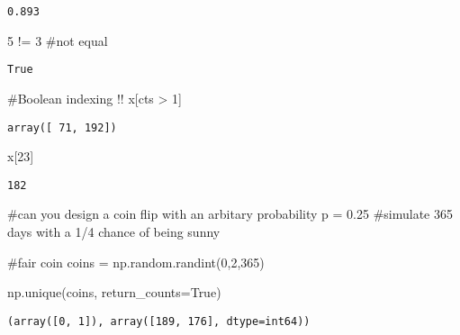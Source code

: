 \documentclass[
  letterpaper,
  DIV=11,
  numbers=noendperiod]{scrreprt}
\newenvironment{Shaded}{\begin{snugshade}}{\end{snugshade}}
\newcommand{\CommentTok}[1]{\textcolor[rgb]{0.37,0.37,0.37}{#1}}
\newcommand{\DecValTok}[1]{\textcolor[rgb]{0.68,0.00,0.00}{#1}}
\newcommand{\NormalTok}[1]{\textcolor[rgb]{0.00,0.23,0.31}{#1}}
\newcommand{\OperatorTok}[1]{\textcolor[rgb]{0.37,0.37,0.37}{#1}}
\newcommand{\VariableTok}[1]{\textcolor[rgb]{0.07,0.07,0.07}{#1}}
\begin{document}
\begin{verbatim}
0.893
\end{verbatim}

\begin{Shaded}
\begin{Highlighting}[]
\DecValTok{5} \OperatorTok{!=} \DecValTok{3} \CommentTok{\#not equal}
\end{Highlighting}
\end{Shaded}

\begin{verbatim}
True
\end{verbatim}

\begin{Shaded}
\begin{Highlighting}[]
\CommentTok{\#Boolean indexing !!}
\NormalTok{x[cts }\OperatorTok{\textgreater{}} \DecValTok{1}\NormalTok{]}
\end{Highlighting}
\end{Shaded}

\begin{verbatim}
array([ 71, 192])
\end{verbatim}

\begin{Shaded}
\begin{Highlighting}[]
\NormalTok{x[}\DecValTok{23}\NormalTok{]}
\end{Highlighting}
\end{Shaded}

\begin{verbatim}
182
\end{verbatim}

\begin{Shaded}
\begin{Highlighting}[]
\CommentTok{\#can you design a coin flip with an arbitary probability p = 0.25}
\CommentTok{\#simulate 365 days with a 1/4 chance of being sunny}

\CommentTok{\#fair coin}
\NormalTok{coins }\OperatorTok{=}\NormalTok{ np.random.randint(}\DecValTok{0}\NormalTok{,}\DecValTok{2}\NormalTok{,}\DecValTok{365}\NormalTok{)}

\NormalTok{np.unique(coins, return\_counts}\OperatorTok{=}\VariableTok{True}\NormalTok{)}
\end{Highlighting}
\end{Shaded}

\begin{verbatim}
(array([0, 1]), array([189, 176], dtype=int64))
\end{verbatim}
\end{document}
